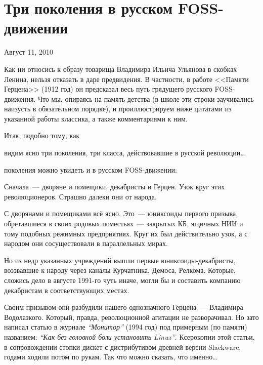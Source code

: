 \section{Три поколения в русском FOSS-движении}

\begin{timeline}Август 11, 2010\end{timeline}

Как ни относись к образу товарища Владимира Ильича Ульянова в скобках Ленина, нельзя отказать в даре предвидения. В частности, в работе <<Памяти Герцена>> (1912 год) он предсказал весь путь грядущего русского FOSS-движения. Что мы, опираясь на память детства (в школе эти строки заучивались наизусть в обязательном порядке), и проиллюстрируем ниже цитатами из указанной работы классика, а также комментариями к ним.

Итак, подобно тому, как
\begin{shadequote}{}
 видим ясно три поколения, три класса, действовавшие в русской революции\dots
\end{shadequote}
 поколения можно увидеть и в русском FOSS-движении:

\begin{shadequote}{}
Сначала~--- дворяне и помещики, декабристы и Герцен. Узок круг этих революционеров. Страшно далеки они от народа.
\end{shadequote}

С дворянами и помещиками всё ясно. Это~--- юниксоиды первого призыва, обретавшиеся в своих родовых поместьях~--- закрытых КБ, ящичных НИИ и тому подобных режимных предприятиях. Круг их был действительно узок, а с народом они сосуществовали в параллельных мирах.

Но из недр указанных учреждений вышли первые юниксоиды-декабристы, воззвавшие к народу через каналы Курчатника, Демоса, Релкома. Которые, сложись дело в августе 1991-го чуть иначе, могли бы и составить компанию декабристам в соответствующих местах.

Своим призывом они разбудили нашего однозначного Герцена~--- Владимира Водолазкого. Который, правда, революционной агитации не разворачивал. Но зато написал статью в журнале \textit{``Монитор''} (1994 год) под примерным (по памяти) названием: \textit{``Как без головной боли установить Linux''}. Ксерокопии этой статьи, в сопровождении стопки дискет с дистрибутивом древней версии Slackware, годами ходили потом по рукам. Так что можно сказать, что именно\dots

